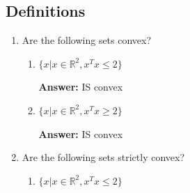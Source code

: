 \documentclass{assignment}
\date{February 29, 2024}
\newcommand{\R}{\mathbb{R}}
\begin{document}
\begin{problem}


\section{Definitions}

\begin{enumerate}

    \item Are the following sets convex?
    
    \begin{enumerate}[label=(\alph*)]

    
        \item $\{x | x \in \R^2, x^Tx \leq 2\}$

        \color{blue}\textbf{Answer:} IS convex\color{black}


        
        \item $\{x | x \in \R^2, x^Tx \geq 2\}$

        \color{blue}\textbf{Answer:} IS convex\color{black}


    \end{enumerate}

        
    \item Are the following sets strictly convex?

    \begin{enumerate}[label=(\alph*)]


        
        \item $\{x | x \in \R^2, x^Tx \leq 2\}$


\end{enumerate}
\end{enumerate}
\end{problem}
\end{document}
